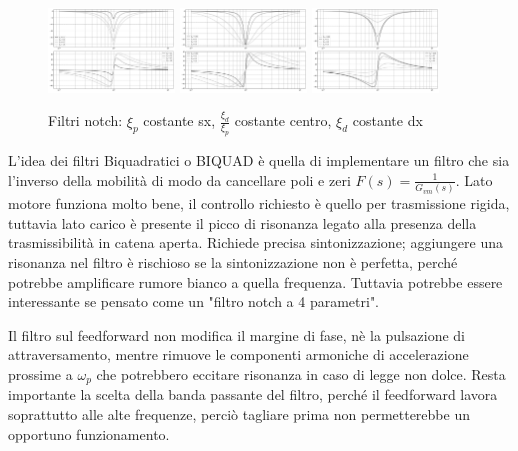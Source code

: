 \begin{figure}[h]
    \centering
    \includegraphics[width=0.3\textwidth]{Immagini/filtro_notch_xip_costante.png}
    \includegraphics[width=0.3\textwidth]{Immagini/filtro_notch_xip_su_xid_costante.png}
    \includegraphics[width=0.3\textwidth]{Immagini/filtro_notch_xid_costante.png}
    \caption{Filtri notch: \(\xi_p\) costante sx, \(\frac{\xi_d}{\xi_p}\) costante centro, \(\xi_d\) costante dx}
\end{figure}

L'idea dei filtri Biquadratici o BIQUAD è quella di implementare un filtro che sia l'inverso della mobilità di modo da cancellare poli e zeri \(F(s)=\frac{1}{G_{vm}(s)}\). Lato motore funziona molto bene, il controllo richiesto è quello per trasmissione rigida, tuttavia lato carico è presente il picco di risonanza legato alla presenza della trasmissibilità in catena aperta.
Richiede precisa sintonizzazione; aggiungere una risonanza nel filtro è rischioso se la sintonizzazione non è perfetta, perché potrebbe amplificare rumore bianco a quella frequenza.
Tuttavia potrebbe essere interessante se pensato come un "filtro notch a 4 parametri".

Il filtro sul feedforward non modifica il margine di fase, nè la pulsazione di attraversamento, mentre rimuove le componenti armoniche di accelerazione prossime a \(\omega_p\) che potrebbero eccitare risonanza in caso di legge non dolce.
Resta importante la scelta della banda passante del filtro, perché il feedforward lavora soprattutto alle alte frequenze, perciò tagliare prima non permetterebbe un opportuno funzionamento.



